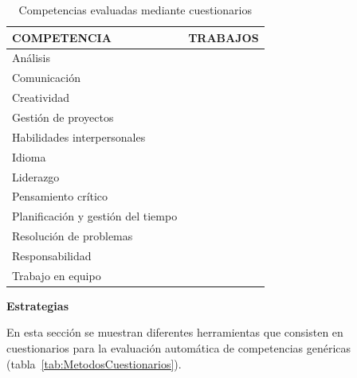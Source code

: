 \begin{table}
  \begin{center}
  \begin{tabular}{| m{3.5cm} | m{9cm} |}
    \hline
    COMPETENCIA & TRABAJOS\\
    \hline
    \hline
    Análisis & \cite{lumsden2005assessment} \\	  
    \hline
    Comunicación & \cite{martinez2014teamwork,barbera2011design,badcock2010developing} \\	  
    \hline
    Creatividad & \cite{albergaria2011critical} \\	  
    \hline
    Gestión de proyectos & \cite{martinez2014teamwork} \\	  
    \hline
    Habilidades interpersonales & \cite{martinez2014teamwork,badcock2010developing} \\	  
    \hline
    Idioma & \cite{fernandez2011experience} \\  
    \hline
    Liderazgo & \cite{martinez2014teamwork} \\	  
    \hline
    Pensamiento crítico & \cite{badcock2010developing,albergaria2011critical} \\	  
    \hline
    Planificación y gestión del tiempo & \cite{martinez2014teamwork} \\	  
    \hline
    Resolución de problemas & \cite{badcock2010developing,vizcarro2013assessment} \\	  
    \hline
    Responsabilidad & \cite{lumsden2005assessment,park2006moral} \\	  
    \hline
    Trabajo en equipo & \cite{martinez2014teamwork,barbera2011design} \\	  
    \hline
  \end{tabular}
\end{center}
\caption{Competencias evaluadas mediante cuestionarios}
\label{tab:CompetenciasCuestionarios}
\end{table} 

\bigskip
\textbf{Estrategias}
\bigskip

En esta sección se muestran diferentes herramientas que consisten en cuestionarios para la evaluación automática de competencias genéricas (tabla~\ref{tab:MetodosCuestionarios}).

